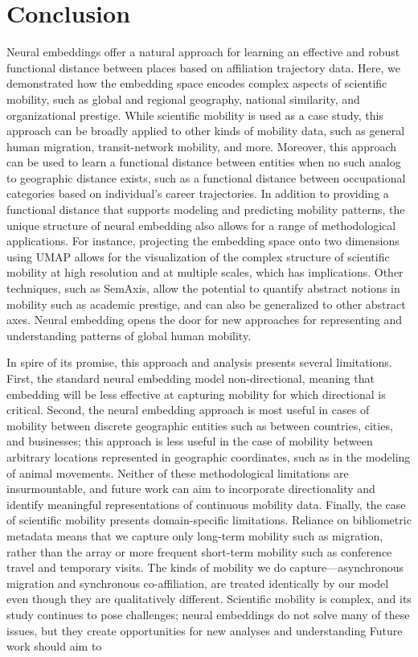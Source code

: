 \documentclass[12pt]{article} %
\begin{document}
%
%
\section*{Conclusion}

Neural embeddings offer a natural approach for learning an effective and robust functional distance between places based on affiliation trajectory data. 
Here, we demonstrated how the embedding space encodes complex aspects of scientific mobility, such as global and regional geography, national similarity, and organizational prestige.
While scientific mobility is used as a case study, this approach can be broadly applied to other kinds of mobility data, such as general human migration, transit-network mobility, and more.
Moreover, this approach can be used to learn a functional distance between entities when no such analog to geographic distance exists, such as a functional distance between occupational categories based on individual's career trajectories. 
In addition to providing a functional distance that supports modeling and predicting mobility patterns, the unique structure of neural embedding also allows for a range of methodological applications.
For instance, projecting the embedding space onto two dimensions using UMAP allows for the visualization of the complex structure of scientific mobility at high resolution and at multiple scales, which has implications. 
Other techniques, such as SemAxis, allow the potential to quantify abstract notions in mobility such as academic prestige, and can also be generalized to other abstract axes.
Neural embedding opens the door for new approaches for representing and understanding patterns of global human mobility.
 

In spire of its promise, this approach and analysis presents several limitations. 
First, the standard neural embedding model non-directional, meaning that embedding will be less effective at capturing mobility for which directional is critical.
Second, the neural embedding approach is most useful in cases of mobility between discrete geographic entities such as between countries, cities, and businesses; this approach is less useful in the case of mobility between arbitrary locations represented in geographic coordinates, such as in the modeling of animal movements. 
Neither of these methodological limitations are insurmountable, and future work can aim to incorporate directionality and identify meaningful representations of continuous mobility data. 
Finally, the case of scientific mobility presents domain-specific limitations. 
Reliance on bibliometric metadata means that we capture only long-term mobility such as migration, rather than the array or more frequent short-term mobility such as conference travel and temporary visits. 
The kinds of mobility we do capture—asynchronous migration and synchronous co-affiliation, are treated identically by our model even though they are qualitatively different.
Scientific mobility is complex, and its study continues to pose challenges; neural embeddings do not solve many of these issues, but they create opportunities for new analyses and understanding
Future work should aim to 
\end{document}
